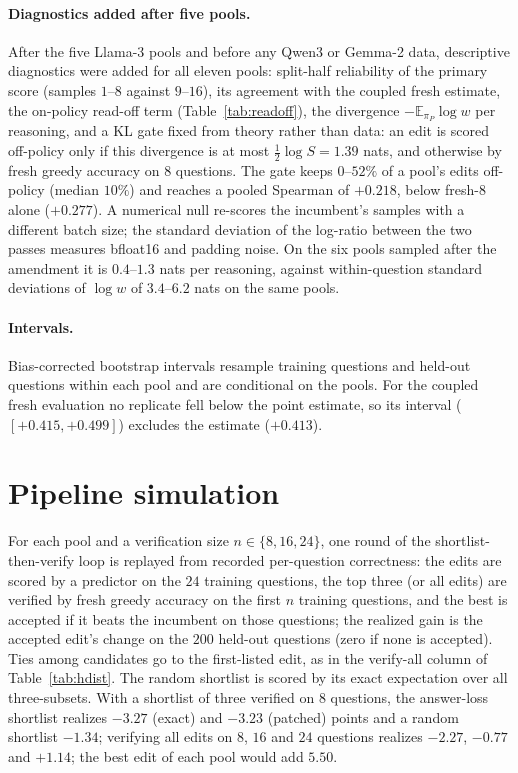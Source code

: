 \paragraph{Diagnostics added after five pools.} After the five Llama-3 pools and before any
Qwen3 or Gemma-2 data, descriptive diagnostics were added for all eleven pools: split-half
reliability of the primary score (samples $1$--$8$ against $9$--$16$), its agreement with the
coupled fresh estimate, the on-policy read-off term (Table~\ref{tab:readoff}), the divergence
$-\mathbb{E}_{\pi_P}\log w$ per reasoning, and a KL gate fixed from theory rather than data: an
edit is scored off-policy only if this divergence is at most $\tfrac12\log S=1.39$ nats, and
otherwise by fresh greedy accuracy on $8$ questions. The gate keeps $0$--$52\%$ of a pool's edits
off-policy (median $10\%$) and reaches a pooled Spearman of $+0.218$, below fresh-8 alone
($+0.277$). A numerical null re-scores the incumbent's samples with a different
batch size; the standard deviation of the log-ratio between the two passes measures bfloat16 and
padding noise. On the six pools sampled after the amendment it is $0.4$--$1.3$ nats per reasoning,
against within-question standard deviations of $\log w$ of $3.4$--$6.2$ nats on the same pools.

\paragraph{Intervals.} Bias-corrected bootstrap intervals resample training questions and
held-out questions within each pool and are conditional on the pools. For the coupled fresh
evaluation no replicate fell below the point estimate, so its interval ($[+0.415,+0.499]$)
excludes the estimate ($+0.413$).

\section{Pipeline simulation}
\label{app:pipeline}
For each pool and a verification size $n\in\{8,16,24\}$, one round of the shortlist-then-verify
loop is replayed from recorded per-question correctness: the edits are scored by a predictor on
the $24$ training questions, the top three (or all edits) are verified by fresh greedy accuracy on
the first $n$ training questions, and the best is accepted if it beats the incumbent on those
questions; the realized gain is the accepted edit's change on the $200$ held-out questions (zero if
none is accepted). Ties among candidates go to the first-listed edit, as in the verify-all column of
Table~\ref{tab:hdist}. The random shortlist is scored by its exact expectation over all
three-subsets. With a shortlist of three verified on $8$ questions, the answer-loss shortlist
realizes $-3.27$ (exact) and $-3.23$ (patched) points and a random shortlist $-1.34$; verifying all
edits on $8$, $16$ and $24$ questions realizes $-2.27$, $-0.77$ and $+1.14$; the best edit of each
pool would add $5.50$.

